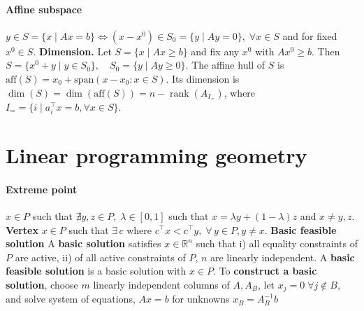 \documentclass{article}
\begin{document}

\paragraph{Affine subspace} $y \in S = \{x \mid Ax=b\} \iff (x - x^0) \in S_0 = \{y \mid Ay = 0\},\; \forall x\in S$ and for fixed $x^0\in S$.
\textbf{Dimension.}
Let $S = \{x \mid A x \geq b\}$ and fix any $x^0$ with $A x^0 \geq b$. Then $S = \{x^0 + y \mid y \in S_0\}, \quad S_0 = \{y \mid A y \geq 0\}$.
The affine hull of $S$ is $\text{aff}(S) = x_0 + \text{span}(x - x_0 : x \in S)$. Its dimension is $\dim(S) = \dim(\text{aff}(S)) = n - \operatorname{rank}(A_{I_=})$, where $I_= = \{i\mid a_i^\top x = b, \forall x\in S\}$.


\section{Linear programming geometry}
\paragraph{Extreme point} $x\in P$ such that $\nexists y,z\in P, \; \lambda \in [0,1]$ such that $x = \lambda y + (1 - \lambda)z$ and $x \neq y,z$.
\textbf{Vertex} $x\in P$ such that $\exists\,c$ where $c^\top x < c^\top y, \; \forall\, y\in P, y\neq x$.
\textbf{Basic feasible solution} A \textbf{basic solution} satisfies $x \in \mathbb R^n$ such that i) all equality constraints of $P$ are active, ii) of all active constraints of $P$, $n$ are linearly independent. A \textbf{basic feasible solution} is a basic solution with $x \in P$. To \textbf{construct a basic solution}, choose $m$ linearly independent columns of $A, A_B$, let $x_j = 0\; \forall j \notin B$, and solve system of equations, $Ax = b$ for unknowns $x_B = A_B^{-1}b$
\end{document}
